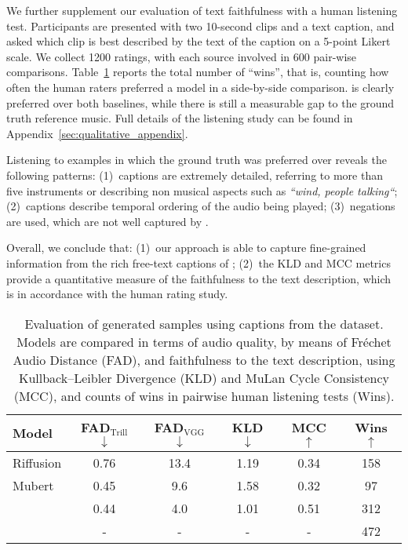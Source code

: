 We further supplement our evaluation of text faithfulness with a human listening test. 
Participants are presented with two 10-second clips and a text caption, and asked which clip is best described by the text of the caption on a 5-point Likert scale. 
We collect 1200 ratings, with each source involved in 600 pair-wise comparisons. Table~\ref{table:quant-eval} reports the total number of ``wins'', that is, counting how often the human raters preferred a model in a side-by-side comparison. 
{\model} is clearly preferred over both baselines, while there is still a measurable gap to the ground truth reference music. Full details of the listening study can be found in Appendix~\ref{sec:qualitative_appendix}.

Listening to examples in which the ground truth was preferred over \model{} reveals the following patterns:
(1)~captions are extremely detailed, referring to more than five instruments or describing non musical aspects such as \textit{``wind, people talking``}; (2)~captions describe temporal ordering of the audio being played; (3)~negations are used, which are not well captured by \mulan.

Overall, we conclude that: (1)~our approach is able to capture fine-grained information from the rich free-text captions of \dataset{}; (2)~the KLD and MCC metrics provide a quantitative measure of the faithfulness to the text description, which is in accordance with the human rating study.

\begin{table}
\setlength{\tabcolsep}{4pt}
\caption{Evaluation of generated samples using captions from the {\dataset} dataset. Models are compared in terms of audio quality, by means of Fréchet Audio Distance (FAD), and faithfulness to the text description, using Kullback–Leibler Divergence (KLD) and  MuLan Cycle Consistency (MCC), and counts of wins in pairwise human listening tests (Wins).}
\label{table:quant-eval}
\vskip 0.15in
\begin{center}
\scriptsize
\begin{sc}
\begin{tabular}{lccccc}
\toprule
Model & FAD$_{\text{Trill}}$ $\downarrow$ & FAD$_{\text{VGG}}$ $\downarrow$ & KLD $\downarrow$ & MCC $\uparrow$ & Wins $\uparrow$ \\
\midrule

Riffusion & 0.76 & 13.4 & 1.19 & 0.34 & 158 \\
Mubert & 0.45 & 9.6 & 1.58 & 0.32 & 97 \\
\model{} & 0.44 & 4.0 & 1.01 & 0.51 & 312 \\
\midrule
\datasetshort{} & - & - & - & - & 472 \\
\bottomrule
\end{tabular}
\end{sc}
\end{center}
\vskip -0.1in
\end{table}


